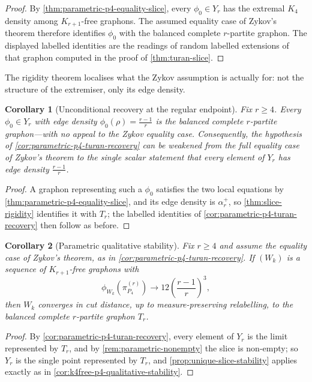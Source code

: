 \documentclass[11pt]{article}
\newtheorem{corollary}[corollary]{Corollary}
\theoremstyle{definition}
\begin{document}
\begin{proof}
By \cref{thm:parametric-p4-equality-slice}, every $\phi_0\in Y_r$ has the extremal
$K_4$ density among $K_{r+1}$-free graphons.  The assumed equality case of Zykov's
theorem therefore identifies $\phi_0$ with the balanced complete $r$-partite graphon.
The displayed labelled identities are the readings of random labelled extensions of that
graphon computed in the proof of \cref{thm:turan-slice}.
\end{proof}

The rigidity theorem localises what the Zykov assumption is actually for: not the
structure of the extremiser, only its edge density.

\begin{corollary}[Unconditional recovery at the regular endpoint]\label{cor:top-endpoint-recovery}
Fix $r\ge4$.  Every $\phi_0\in Y_r$ with edge density $\phi_0(\rho)=\frac{r-1}r$ is the
balanced complete $r$-partite graphon---with no appeal to the Zykov equality case.
Consequently, the hypothesis of \cref{cor:parametric-p4-turan-recovery} can be weakened
from the full equality case of Zykov's theorem to the single scalar statement that
every element of $Y_r$ has edge density $\frac{r-1}r$.
\end{corollary}

\begin{proof}
A graphon representing such a $\phi_0$ satisfies the two local equations by
\cref{thm:parametric-p4-equality-slice}, and its edge density is $\alpha_r^+$, so
\cref{thm:slice-rigidity} identifies it with $T_r$; the labelled identities of
\cref{cor:parametric-p4-turan-recovery} then follow as before.
\end{proof}

\begin{corollary}[Parametric qualitative stability]\label{cor:parametric-qualitative-stability}
Fix $r\ge4$ and assume the equality case of Zykov's theorem, as in
\cref{cor:parametric-p4-turan-recovery}.  If $(W_k)$ is a sequence of $K_{r+1}$-free
graphons with
\[
  \phi_{W_k}(\pi_{P_4}^{(r)})\longrightarrow12\left(\frac{r-1}{r}\right)^3,
\]
then $W_k$ converges in cut distance, up to measure-preserving relabelling, to the
balanced complete $r$-partite graphon $T_r$.
\end{corollary}

\begin{proof}
By \cref{cor:parametric-p4-turan-recovery}, every element of $Y_r$ is the limit
represented by $T_r$, and by \cref{rem:parametric-nonempty} the slice is non-empty; so
$Y_r$ is the single point represented by $T_r$, and
\cref{prop:unique-slice-stability} applies exactly as in
\cref{cor:k4free-p4-qualitative-stability}.
\end{proof}
\end{document}
